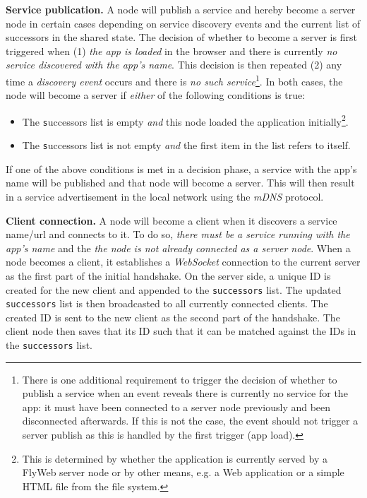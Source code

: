 \noindent\textbf{Service publication.}
A \APIshort node will publish a service and hereby become a server node in certain cases depending on service discovery events and the current list of successors in the shared state. 
The decision of whether to become a server is first triggered when (1) \textit{the app is loaded} in the browser and there is currently \textit{no service discovered with the app's name}. 
This decision is then repeated (2) any time a \textit{discovery event} occurs and there is \textit{no such service}\footnote{There is one additional requirement to trigger the decision of whether to publish a service when an event reveals there is currently no service for the app: it must have been connected to a server node previously and been disconnected afterwards. 
If this is not the case, the event should not trigger a server publish as this is handled by the first trigger (app load).}. 
In both cases, the node will become a server if \textit{either} of the following conditions is true:
\begin{itemize}
    \item The \texttt successors list is empty \textit{and} this node loaded the application initially\footnote{This is determined by whether the application is currently served by a FlyWeb server node or by other means, e.g. a Web application or a simple HTML file from the file system.}.
    \item The \texttt successors list is not empty \textit{and} the first item in the list refers to itself.
\end{itemize}

If one of the above conditions is met in a decision phase, a service with the app's name will be published and that node will become a server. This will then result in a service advertisement  in the local network using the \textit{mDNS} protocol. 




\noindent\textbf{Client connection.}
A \APIshort node will become a client when it discovers a service name/url and connects to it.
To do so, \textit{there must be a \APIshort service running with the app's name} and the \textit{the node is not already connected as a server node}. 
When a node becomes a client, it establishes a \textit{WebSocket} connection to the current server as the first part of the initial handshake. 
On the server side, a unique ID is created for the new client and appended to the \texttt{successors} list. 
The updated \texttt{successors} list is then broadcasted to all currently connected clients. 
The created ID is sent to the new client as the second part of the handshake.
The client node then saves that its ID such that it can be matched against the IDs in the \texttt{successors} list.


